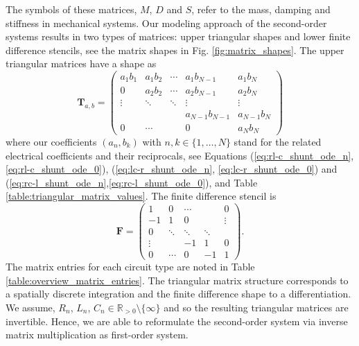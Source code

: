 The symbols of these matrices, $M$, $D$ and $S$, refer to the mass, damping and stiffness in mechanical systems. Our modeling approach of the second-order systems results in two types of matrices: upper triangular shapes and lower finite difference stencils, see the matrix shapes in Fig. \ref{fig:matrix_shapes}. The upper triangular matrices have a shape as
\begin{equation}
	\mathbf{T}_{a,b} = 
	\begin{pmatrix}
		a_{1} b_{1} & a_{1} b_{2} & \cdots &  a_{1} b_{N-1} & a_{1} b_{N} \\
		0 			& a_{2} b_{2} & \cdots &  a_{2} b_{N-1} & a_{2} b_{N} \\
		\vdots			& \ddots	  & \ddots &  \vdots        & 	\vdots	  \\
		&			  &        & a_{N-1} b_{N-1}& a_{N-1} b_{N} \\
		0			&	\cdots		  &        &	0            & a_{N} b_{N} 
	\end{pmatrix}
	\label{eq:triangular_matrix} 
\end{equation}
where our coefficients $(a_{n}, b_{k})$ with $n,k \in \{1,\ldots,N\}$ stand for the related electrical coefficients and their reciprocals, see Equations (\ref{eq:rl-c_shunt_ode_n}, \ref{eq:rl-c_shunt_ode_0}), (\ref{eq:lc-r_shunt_ode_n}, \ref{eq:lc-r_shunt_ode_0}) and (\ref{eq:rc-l_shunt_ode_n},\ref{eq:rc-l_shunt_ode_0}), and Table \ref{table:triangular_matrix_values}. The finite difference stencil is
\begin{equation}
	\mathbf{F} = 
	\begin{pmatrix}
		1 & 0 & \cdots &  &  0\\
		-1 			& 1 & 0 &   & \vdots  \\
		0 & \ddots	  & \ddots & \ddots  & 	 \\
		\vdots &			  &     -1  & 1 &  0 \\
		0 &	\cdots		  &     0   & -1  & 1 
	\end{pmatrix} 
	\textbf{.}
	\label{eq:finite_diff_stencil} 
\end{equation}
The matrix entries for each circuit type are noted in Table \ref{table:overview_matrix_entries}. The triangular matrix structure corresponds to a spatially discrete integration and the finite difference shape to a differentiation.  We assume, $R_{n}$, $L_{n}$, $C_{n} \in \mathbb{R}_{>0} \setminus \{\infty\}$ and so the resulting triangular matrices are invertible. Hence, we are able to reformulate the second-order system via inverse matrix multiplication as first-order system. 

